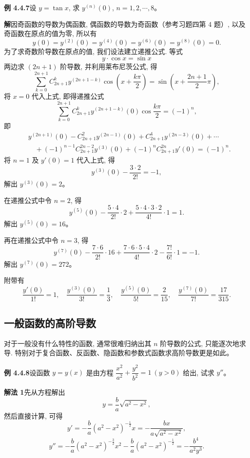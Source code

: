 \documentclass[UTF8,12pt,a4paper,fontset=fandol]{ctexart}
\begin{document}
\noindent\textbf{例 4.4.7}\quad 设 $y=\tan x$, 求 $y^{(n)}(0)$, $n=1,2,\cdots,8$。

\noindent\textbf{解}\quad 因奇函数的导数为偶函数, 偶函数的导数为奇函数（参考习题四第 4 题）, 以及奇函数在原点的值为零, 所以有
\[
  y(0)=y^{(2)}(0)=y^{(4)}(0)=y^{(6)}(0)=y^{(8)}(0)=0.
\]
为了求奇数阶导数在原点的值, 我们设法建立递推公式. 等式
\[
  y\cdot\cos x=\sin x
\]
两边求 $(2n+1)$ 阶导数, 并利用莱布尼茨公式, 得
\[
  \sum_{k=0}^{2n+1}
  C_{2n+1}^ky^{(2n+1-k)}
  \cos\left(x+\frac{k\pi}{2}\right)
  =
  \sin\left(x+\frac{2n+1}{2}\pi\right),
\]
将 $x=0$ 代入上式, 即得递推公式
\[
  \sum_{k=0}^{2n+1}
  C_{2n+1}^ky^{(2n+1-k)}(0)\cos\frac{k\pi}{2}
  =
  (-1)^n,
\]
即
\[
\begin{aligned}
  &y^{(2n+1)}(0)
  -C_{2n+1}^{2}y^{(2n-1)}(0)
  +C_{2n+1}^{4}y^{(2n-3)}(0)+\cdots \\
  &\quad
  +(-1)^{n-1}C_{2n+1}^{2n-2}y^{(3)}(0)
  +(-1)^nC_{2n+1}^{2n}y'(0)
  =
  (-1)^n.
\end{aligned}
\]
将 $n=1$ 及 $y'(0)=1$ 代入上式, 得
\[
  y^{(3)}(0)-\frac{3\cdot2}{2!}=-1,
\]
解出 $y^{(3)}(0)=2$。

在递推公式中令 $n=2$, 得
\[
  y^{(5)}(0)-\frac{5\cdot4}{2!}\cdot2
  +
  \frac{5\cdot4\cdot3\cdot2}{4!}\cdot1
  =
  1.
\]
解出 $y^{(5)}(0)=16$。

再在递推公式中令 $n=3$, 得
\[
  y^{(7)}(0)-\frac{7\cdot6}{2!}\cdot16
  +
  \frac{7\cdot6\cdot5\cdot4}{4!}\cdot2
  -
  \frac{7!}{6!}\cdot1
  =
  -1.
\]
解出 $y^{(7)}(0)=272$。

附带有
\[
  \frac{y'(0)}{1!}=1,\quad
  \frac{y^{(3)}(0)}{3!}=\frac13,\quad
  \frac{y^{(5)}(0)}{5!}=\frac{2}{15},\quad
  \frac{y^{(7)}(0)}{7!}=\frac{17}{315}.
\]

\subsection{一般函数的高阶导数}

对于一般没有什么特性的函数, 通常很难归纳出其 $n$ 阶导数的公式, 只能逐次地求导. 特别对于复合函数、反函数、隐函数和参数式函数求高阶导数更是如此。

\noindent\textbf{例 4.4.8}\quad 设函数 $y=y(x)$ 是由方程 $\dfrac{x^2}{a^2}+\dfrac{y^2}{b^2}=1\ (y>0)$ 给出, 试求 $y''$。

\noindent\textbf{解法 1}\quad 先从方程解出
\[
  y=\frac{b}{a}\sqrt{a^2-x^2},
\]
然后直接计算, 可得
\[
  y'
  =
  -\frac{b}{a}(a^2-x^2)^{-\frac12}x
  =
  -\frac{bx}{a\sqrt{a^2-x^2}},
\]
\[
  y''
  =
  -\frac{b}{a}(a^2-x^2)^{-\frac32}x^2
  -
  \frac{b}{a}(a^2-x^2)^{-\frac12}
  =
  -\frac{b^4}{a^2y^3}.
\]
\end{document}
